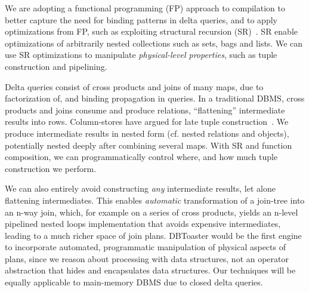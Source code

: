 We are adopting a functional programming (FP) approach to compilation to better
capture the need for binding patterns in delta queries, and to apply
optimizations from FP, such as exploiting structural recursion
(SR)~\cite{buneman-kleisli:95}. SR enable optimizations of arbitrarily nested
collections such as sets, bags and lists. We can use SR optimizations to
manipulate \textit{physical-level properties}, such as tuple construction and
pipelining.

Delta queries consist of cross products and joins of many maps, due to
factorization of, and binding propagation in queries. In a traditional DBMS,
cross products and joins consume and produce relations, ``flattening''
intermediate results into rows. Column-stores have argued for late tuple
construction~\cite{abadi-icde:07}. We produce intermediate results in nested
form (cf. nested relations and objects), potentially nested deeply after
combining several maps. With SR and function composition, we can
programmatically control where, and how much tuple construction we perform.

We can also entirely avoid constructing \textit{any} intermediate results, let
alone flattening intermediates. This enables \textit{automatic} transformation
of a join-tree into an n-way join, which, for example on a series of cross
products, yields an n-level pipelined nested loops implementation that avoids
expensive intermediates, leading to a much richer space of join plans. DBToaster
would be the first engine to incorporate automated, programmatic manipulation of
physical aspects of plans, since we reason about processing with data
structures, not an operator abstraction that hides and encapsulates data
structures. Our techniques will be equally applicable to main-memory DBMS due to
closed delta queries.


